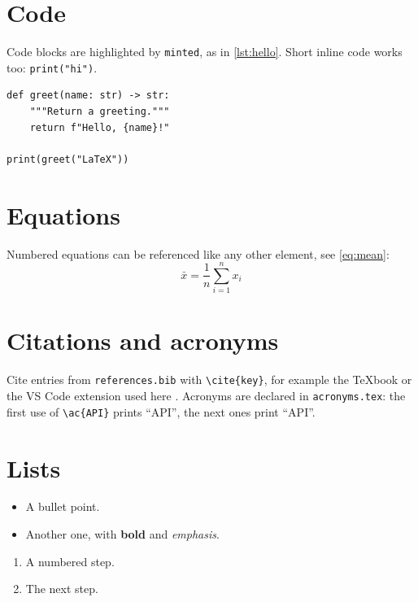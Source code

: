 \section{Code}

Code blocks are highlighted by \texttt{minted}, as in \cref{lst:hello}.
Short inline code works too: \texttt{print("hi")}.

\begin{listing}[H]
  \begin{verbatim}
def greet(name: str) -> str:
    """Return a greeting."""
    return f"Hello, {name}!"

print(greet("LaTeX"))
  \end{verbatim}
  \caption{A Python function.}
  \label{lst:hello}
\end{listing}

\section{Equations}

Numbered equations can be referenced like any other element, see
\cref{eq:mean}:
\begin{equation}
  \bar{x} = \frac{1}{n} \sum_{i=1}^{n} x_i
  \label{eq:mean}
\end{equation}

\section{Citations and acronyms}

Cite entries from \texttt{references.bib} with \verb|\cite{key}|, for example
the \TeX{}book \cite{knuth1984texbook} or the VS Code extension used here
\cite{latexworkshop}. Acronyms are declared in \texttt{acronyms.tex}: the
first use of \verb|\ac{API}| prints ``\ac{API}'', the next ones print
``\ac{API}''.

\section{Lists}

\begin{itemize}
  \item A bullet point.
  \item Another one, with \textbf{bold} and \emph{emphasis}.
\end{itemize}

\begin{enumerate}
  \item A numbered step.
  \item The next step.
\end{enumerate}
